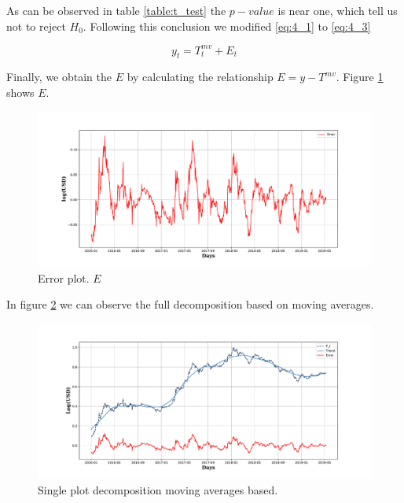 As can be observed in table \ref{table:t_test} the $p-value$ is near one, which tell us not to reject $H_{0}$. Following this conclusion we modified  \ref{eq:4_1} to \ref{eq:4_3} 

\begin{equation}
y_{t}=T^{mv}_{t}+E_{t}
\label{eq:4_3}
\end{equation}

Finally, we obtain the $E$ by calculating the relationship  $E=y-T^{mv}$. Figure \ref{fig:error} shows $E$. 

\begin{figure}[htpb!] %
	\centering %
	\includegraphics[width=\textwidth]{data/Residual_error_u.pdf} %
	\caption{Error plot. $E$} %
	\label{fig:error} %
\end{figure}

In figure \ref{fig:single_plot} we can observe the full decomposition based on moving averages.

\begin{figure}[htpb!] %
	\centering %
	\includegraphics[width=\textwidth]{data/single_plot.pdf} %
	\caption{Single plot decomposition moving averages based.} %
	\label{fig:single_plot} %
\end{figure}


